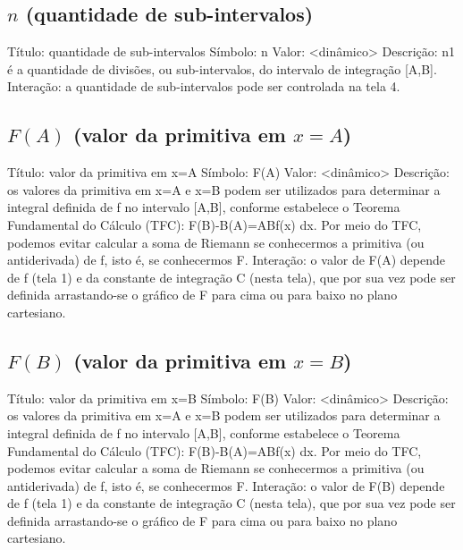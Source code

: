 \documentclass[a4paper,10pt]{scrartcl}
\begin{document}
  \subsection*{$n$ (quantidade de sub-intervalos)}
	Título: quantidade de sub-intervalos
	Símbolo: n
	Valor: <dinâmico>
	Descrição: n1 é a quantidade de divisões, ou sub-intervalos, do intervalo de integração [A,B].
	Interação: a quantidade de sub-intervalos pode ser controlada na tela 4.

  \subsection*{$F(A)$ (valor da primitiva em $x=A$)}
	Título: valor da primitiva em x=A
	Símbolo: F(A)
	Valor: <dinâmico>
	Descrição: os valores da primitiva em x=A e x=B podem ser utilizados para determinar a integral definida de f no intervalo [A,B], conforme estabelece o Teorema Fundamental do Cálculo (TFC): F(B)-B(A)=ABf(x) dx. Por meio do TFC, podemos evitar calcular a soma de Riemann se conhecermos a primitiva (ou antiderivada) de f, isto é, se conhecermos F.
	Interação: o valor de F(A) depende de f (tela 1) e da constante de integração C (nesta tela), que por sua vez pode ser definida arrastando-se o gráfico de F para cima ou para baixo no plano cartesiano.

  \subsection*{$F(B)$ (valor da primitiva em $x=B$)}
	Título: valor da primitiva em x=B
	Símbolo: F(B)
	Valor: <dinâmico>
	Descrição: os valores da primitiva em x=A e x=B podem ser utilizados para determinar a integral definida de f no intervalo [A,B], conforme estabelece o Teorema Fundamental do Cálculo (TFC): F(B)-B(A)=ABf(x) dx. Por meio do TFC, podemos evitar calcular a soma de Riemann se conhecermos a primitiva (ou antiderivada) de f, isto é, se conhecermos F.
	Interação: o valor de F(B) depende de f (tela 1) e da constante de integração C (nesta tela), que por sua vez pode ser definida arrastando-se o gráfico de F para cima ou para baixo no plano cartesiano.
\end{document}

